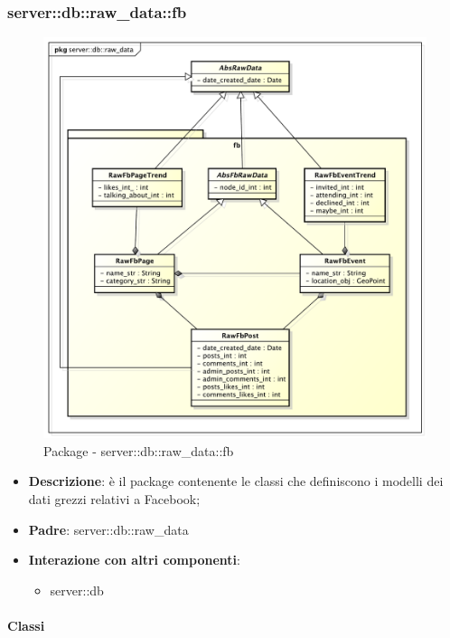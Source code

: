 		\subsubsection{server::db::raw\_data::fb} %
		\label{ssub:bdsm_app_server_db_raw_data_fb}
		\begin{figure}[htbp]
			\centering
			\centerline{\includegraphics[scale=0.5]{./images/server/raw_data_fb.pdf}}
			\caption{Package - server::db::raw\_data::fb}
		\end{figure}

		\begin{itemize}
		  \item \textbf{Descrizione}:  è il package contenente le classi che definiscono i modelli dei dati grezzi relativi a Facebook;
		  \item \textbf{Padre}: server::db::raw\_data
		  \item \textbf{Interazione con altri componenti}:
		  	\begin{itemize}
		  		\item server::db
				\end{itemize}
		\end{itemize}

		\paragraph{Classi} %

